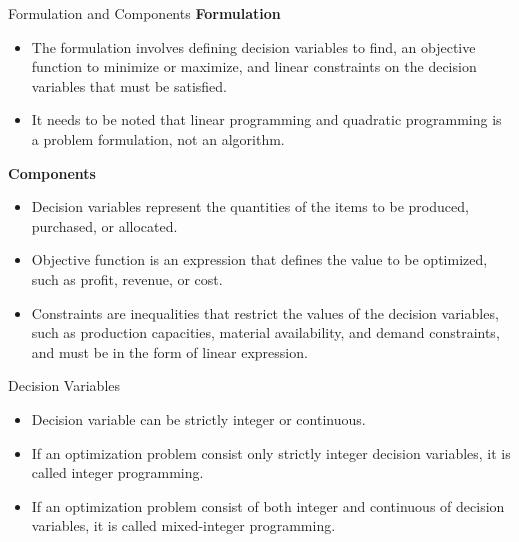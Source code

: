 \documentclass{beamer}
\begin{document}
\begin{frame}{Formulation and Components}
    \textbf{Formulation}

    \begin{itemize}
        \item The formulation involves defining \textcolor{var}{decision variables} to find, an \textcolor{obj}{objective function} to \textcolor{opt}{minimize} or \textcolor{opt}{maximize}, and \textcolor{const}{linear constraints} on the \textcolor{var}{decision variables} that must be satisfied.
        \item It needs to be noted that linear programming and quadratic programming is a problem formulation, not an algorithm. %
    \end{itemize}

    \textbf{Components}

    \begin{itemize}
        \item \textcolor{var}{Decision variables} represent the quantities of the items to be produced, purchased, or allocated.
        \item \textcolor{obj}{Objective function} is an expression that defines the value to be optimized, such as profit, revenue, or cost.
        \item \textcolor{const}{Constraints} are inequalities that restrict the values of the \textcolor{var}{decision variables}, such as production capacities, material availability, and demand constraints, and must be in the form of linear expression.
    \end{itemize}
\end{frame}

\begin{frame}{Decision Variables}
    \begin{itemize}
        \item \textcolor{var}{Decision variable} can be strictly integer or continuous.
        \item If an optimization problem consist only strictly integer \textcolor{var}{decision variables}, it is called \textcolor{var}{integer} programming.
        \item If an optimization problem consist of both integer and continuous of \textcolor{var}{decision variables}, it is called \textcolor{var}{mixed-integer} programming.
    \end{itemize}
\end{frame}
\end{document}
